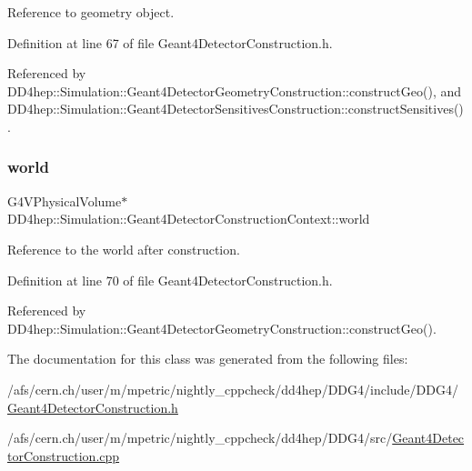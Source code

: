 Reference to geometry object. 



Definition at line 67 of file Geant4\+Detector\+Construction.\+h.



Referenced by D\+D4hep\+::\+Simulation\+::\+Geant4\+Detector\+Geometry\+Construction\+::construct\+Geo(), and D\+D4hep\+::\+Simulation\+::\+Geant4\+Detector\+Sensitives\+Construction\+::construct\+Sensitives().

\hypertarget{class_d_d4hep_1_1_simulation_1_1_geant4_detector_construction_context_a532857c4548770776adf8f94db5e5e56}{}\label{class_d_d4hep_1_1_simulation_1_1_geant4_detector_construction_context_a532857c4548770776adf8f94db5e5e56} 
\subsubsection{\texorpdfstring{world}{world}}
{\footnotesize\ttfamily G4\+V\+Physical\+Volume$\ast$ D\+D4hep\+::\+Simulation\+::\+Geant4\+Detector\+Construction\+Context\+::world}



Reference to the world after construction. 



Definition at line 70 of file Geant4\+Detector\+Construction.\+h.



Referenced by D\+D4hep\+::\+Simulation\+::\+Geant4\+Detector\+Geometry\+Construction\+::construct\+Geo().



The documentation for this class was generated from the following files\+:\begin{DoxyCompactItemize}
\item 
/afs/cern.\+ch/user/m/mpetric/nightly\+\_\+cppcheck/dd4hep/\+D\+D\+G4/include/\+D\+D\+G4/\hyperlink{_geant4_detector_construction_8h}{Geant4\+Detector\+Construction.\+h}\item 
/afs/cern.\+ch/user/m/mpetric/nightly\+\_\+cppcheck/dd4hep/\+D\+D\+G4/src/\hyperlink{_geant4_detector_construction_8cpp}{Geant4\+Detector\+Construction.\+cpp}\end{DoxyCompactItemize}
